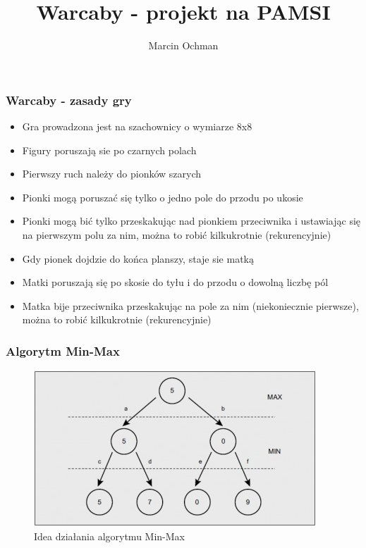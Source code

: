 \documentclass{beamer}
\author{Marcin Ochman}
\title{Warcaby - projekt na PAMSI}
\date{}
\institute{Politechnika Wrocławska}
\begin{document}
  \begin{frame}
		\titlepage
  \end{frame}
  
  \begin{frame}
 	\frametitle{Warcaby - zasady gry}
 	\begin{itemize}
 	   \item Gra prowadzona jest na szachownicy o wymiarze 8x8
 	   \item Figury poruszają sie po czarnych polach
 	   \item Pierwszy ruch należy do pionków szarych
 	   \item Pionki mogą poruszać się tylko o jedno pole do przodu
 	   		 	po ukosie
 	   \item Pionki mogą bić tylko przeskakując nad pionkiem 
 	   			przeciwnika i ustawiając się na pierwszym polu za 
 	   			nim, można to robić kilkukrotnie (rekurencyjnie)
 	   \item Gdy pionek dojdzie do końca planszy, staje sie matką
 	   \item Matki poruszają się po skosie do tyłu i do przodu o 
 	   			dowolną liczbę pól
 	   \item Matka bije przeciwnika przeskakując na pole za nim 
 	   			(niekoniecznie pierwsze), można to robić 
 	   			kilkukrotnie (rekurencyjnie)
 	\end{itemize}
  \end{frame}
  
  
  \begin{frame}
  	\frametitle{Algorytm Min-Max}
  	 \begin{figure}[H]
       \centering
  	   \includegraphics[width=0.7\linewidth]{./img/minmax}
  	   \caption{Idea działania algorytmu Min-Max}
  	   \label{fig:minmax}
  	 \end{figure}
  \end{frame}
  
\end{document}
